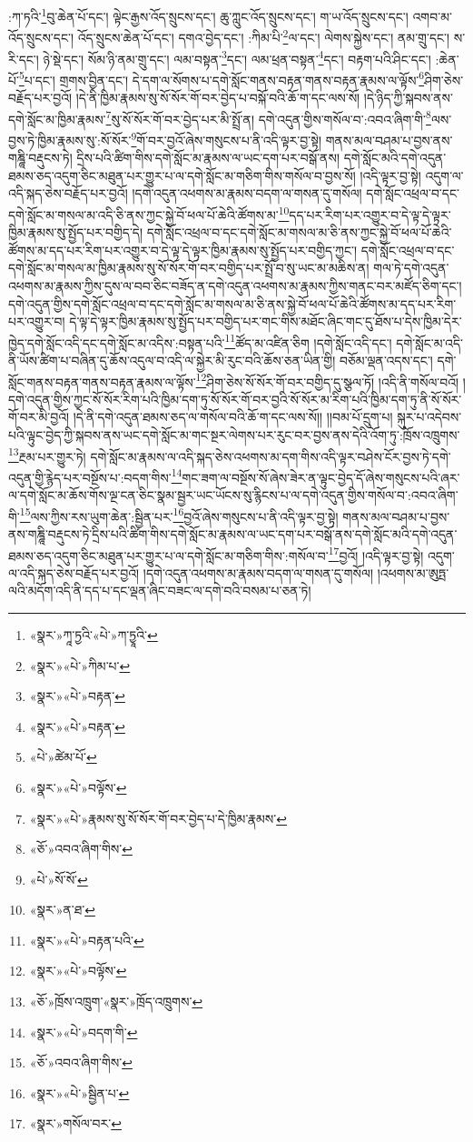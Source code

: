 :ཀ་ཏའི་\footnote{«སྣར་»ཀཱ་ཏྱའི་«པེ་»ཀ་ཏྱཱའི་}བུ་ཆེན་པོ་དང་། ལྟེང་རྒྱས་འོད་སྲུངས་དང་། ཆུ་ཀླུང་འོད་སྲུངས་དང་། ག་ཡ་འོད་སྲུངས་དང་། འགབ་མ་འོད་སྲུངས་དང་། འོད་སྲུངས་ཆེན་པོ་དང་། དགའ་བྱེད་དང་། :ཀིམ་པི་\footnote{«སྣར་»«པེ་»ཀིམ་པ་}ལ་དང་། ལེགས་སྐྱེས་དང་། ནམ་གྲུ་དང་། ས་རི་དང་། ཉེ་སྡེ་དང་། སོམ་ཉི་ནམ་གྲུ་དང་། ལམ་བསྟན་\footnote{«སྣར་»«པེ་»བརྟན་}དང་། ལམ་ཕྲན་བསྟན་\footnote{«སྣར་»«པེ་»བརྟན་}དང་། བརྟག་པའི་ཤིང་དང་། :ཆེན་པོ་\footnote{«པེ་»ཚེམ་པོ་}པ་དང་། གྲགས་བྱིན་དང་། དེ་དག་ལ་སོགས་པ་དགེ་སློང་གནས་བརྟན་གནས་བརྟན་རྣམས་ལ་ལྟོས་\footnote{«སྣར་»«པེ་»བལྟོས་}ཤིག་ཅེས་བརྗོད་པར་བྱའོ། །དེ་ནི་ཁྱིམ་རྣམས་སུ་སོ་སོར་གོ་བར་བྱེད་པ་བསྐོ་བའི་ཆོ་ག་དང་ལས་སོ། །དེ་ཉིད་ཀྱི་སྐབས་ནས་དགེ་སློང་མ་ཁྱིམ་རྣམས་\footnote{«སྣར་»«པེ་»རྣམས་སུ་སོ་སོར་གོ་བར་བྱེད་པ་དེ་ཁྱིམ་རྣམས་}སུ་སོ་སོར་གོ་བར་བྱེད་པར་མི་སྤྲོ་ན། དགེ་འདུན་གྱིས་གསོལ་བ་:འབའ་ཞིག་གི་\footnote{«ཅོ་»འབའ་ཞིག་གིས་}ལས་བྱས་ཏེ་ཁྱིམ་རྣམས་སུ་:སོ་སོར་\footnote{«པེ་»སོ་སོ་}གོ་བར་བྱའོ་ཞེས་གསུངས་པ་ནི་འདི་ལྟར་བྱ་སྟེ། གནས་མལ་བཤམ་པ་བྱས་ནས་གཎྜཱི་བརྡུངས་ཏེ། དྲིས་པའི་ཚིག་གིས་དགེ་སློང་མ་རྣམས་ལ་ཡང་དག་པར་བསྒོ་ནས། དགེ་སློང་མའི་དགེ་འདུན་ཐམས་ཅད་འདུག་ཅིང་མཐུན་པར་གྱུར་པ་ལ་དགེ་སློང་མ་གཅིག་གིས་གསོལ་བ་བྱས་སོ། །འདི་ལྟར་བྱ་སྟེ། འདུག་ལ་འདི་སྐད་ཅེས་བརྗོད་པར་བྱའོ། །དགེ་འདུན་འཕགས་མ་རྣམས་བདག་ལ་གསན་དུ་གསོལ། དགེ་སློང་འཕྲལ་བ་དང་དགེ་སློང་མ་གསལ་མ་འདི་ཅི་ནས་ཀྱང་སྐྱེ་བོ་ཕལ་པོ་ཆེའི་ཚོགས་མ་\footnote{«སྣར་»ན་ཐ་}དད་པར་རིག་པར་འགྱུར་བ་དེ་ལྟ་དེ་ལྟར་ཁྱིམ་རྣམས་སུ་སྤྱོད་པར་བགྱིད་དེ། དགེ་སློང་འཕྲལ་བ་དང་དགེ་སློང་མ་གསལ་མ་ཅི་ནས་ཀྱང་སྐྱེ་བོ་ཕལ་པོ་ཆེའི་ཚོགས་མ་དད་པར་རིག་པར་འགྱུར་བ་དེ་ལྟ་དེ་ལྟར་ཁྱིམ་རྣམས་སུ་སྤྱོད་པར་བགྱིད་ཀྱང་། དགེ་སློང་འཕྲལ་བ་དང་དགེ་སློང་མ་གསལ་མ་ཁྱིམ་རྣམས་སུ་སོ་སོར་གོ་བར་བགྱིད་པར་སྤྲོ་བ་སུ་ཡང་མ་མཆིས་ན། གལ་ཏེ་དགེ་འདུན་འཕགས་མ་རྣམས་ཀྱིས་དུས་ལ་བབ་ཅིང་བཟོད་ན་དགེ་འདུན་འཕགས་མ་རྣམས་ཀྱིས་གནང་བར་མཛོད་ཅིག་དང་། དགེ་འདུན་གྱིས་དགེ་སློང་འཕྲལ་བ་དང་དགེ་སློང་མ་གསལ་མ་ཅི་ནས་སྐྱེ་བོ་ཕལ་པོ་ཆེའི་ཚོགས་མ་དད་པར་རིག་པར་འགྱུར་བ། དེ་ལྟ་དེ་ལྟར་ཁྱིམ་རྣམས་སུ་སྤྱོད་པར་བགྱིད་པར་གང་གིས་མཐོང་ཞིང་གང་དུ་ཐོས་པ་དེས་ཁྱིམ་དེར་ཁྱེད་དགེ་སློང་འདི་དང་དགེ་སློང་མ་འདིས་:བསྟན་པའི་\footnote{«སྣར་»«པེ་»བརྟན་པའི་}ཚོད་མ་འཛིན་ཅིག །དགེ་སློང་འདི་དང་། དགེ་སློང་མ་འདི་ནི་ཡོས་ཚིག་པ་བཞིན་དུ་ཆོས་འདུལ་བ་འདི་ལ་སྐྱེར་མི་རུང་བའི་ཆོས་ཅན་ཡིན་གྱི། བཅོམ་ལྡན་འདས་དང་། དགེ་སློང་གནས་བརྟན་གནས་བརྟན་རྣམས་ལ་ལྟོས་\footnote{«སྣར་»«པེ་»བལྟོས་}ཤིག་ཅེས་སོ་སོར་གོ་བར་བགྱིད་དུ་སྩལ་ཏོ། །འདི་ནི་གསོལ་བའོ། །དགེ་འདུན་གྱིས་ཀྱང་སོ་སོར་རིག་པའི་ཁྱིམ་དག་ཏུ་སོ་སོར་གོ་བར་བྱའི་སོ་སོར་མ་རིག་པའི་ཁྱིམ་དག་ཏུ་ནི་སོ་སོར་གོ་བར་མི་བྱའོ། །དེ་ནི་དགེ་འདུན་ཐམས་ཅད་ལ་གསོལ་བའི་ཆོ་ག་དང་ལས་སོ།། །།བམ་པོ་དྲུག་པ། སྐུར་པ་འདེབས་པའི་ལྟུང་བྱེད་ཀྱི་སྐབས་ནས་ཡང་དགེ་སློང་མ་གང་སྔར་ལེགས་པར་རུང་བར་བྱས་ནས་དེའི་འོག་ཏུ་:ཁྲོས་འཁྲུགས་\footnote{«ཅོ་»ཁྲོས་འཁྲུག་«སྣར་»ཁྲོད་འཁྲུགས་}རྔམ་པར་གྱུར་ཏེ། དགེ་སློང་མ་རྣམས་ལ་འདི་སྐད་ཅེས་འཕགས་མ་དག་གིས་འདི་ལྟར་བཤེས་ངོར་བྱས་ཏེ་དགེ་འདུན་གྱི་རྙེད་པར་བསྔོས་པ་:བདག་གིས་\footnote{«སྣར་»«པེ་»བདག་གི་}གང་ཟག་ལ་བསྔོས་སོ་ཞེས་ཟེར་ན་ལྟུང་བྱེད་དོ་ཞེས་གསུངས་པའི་ཞར་ལ་དགེ་སློང་མ་ཆོས་གོས་ལྔ་ངན་ཅིང་སྣམ་སྦྱར་ཡང་ཡོངས་སུ་རྙིངས་པ་ལ་དགེ་འདུན་གྱིས་གསོལ་བ་:འབའ་ཞིག་གི་\footnote{«ཅོ་»འབའ་ཞིག་གིས་}ལས་ཀྱིས་རས་ཡུག་ཆེན་:སྦྱིན་པར་\footnote{«སྣར་»«པེ་»སྦྱིན་པ་}བྱའོ་ཞེས་གསུངས་པ་ནི་འདི་ལྟར་བྱ་སྟེ། གནས་མལ་བཤམ་པ་བྱས་ནས་གཎྜཱི་བརྡུངས་ཏེ་དྲིས་པའི་ཚིག་གིས་དགེ་སློང་མ་རྣམས་ལ་ཡང་དག་པར་བསྒོ་ནས་དགེ་སློང་མའི་དགེ་འདུན་ཐམས་ཅད་འདུག་ཅིང་མཐུན་པར་གྱུར་པ་ལ་དགེ་སློང་མ་གཅིག་གིས་:གསོལ་བ་\footnote{«སྣར་»གསོལ་བར་}བྱའོ། །འདི་ལྟར་བྱ་སྟེ། འདུག་ལ་འདི་སྐད་ཅེས་བརྗོད་པར་བྱའོ། །དགེ་འདུན་འཕགས་མ་རྣམས་བདག་ལ་གསན་དུ་གསོལ། །འཕགས་མ་ཨུཏྤ་ལའི་མདོག་འདི་ནི་དད་པ་དང་ལྡན་ཞིང་བཟང་ལ་དགེ་བའི་བསམ་པ་ཅན་ཏེ། 